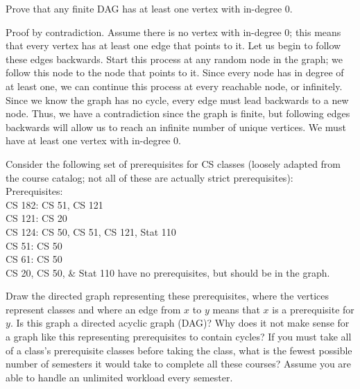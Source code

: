 \documentclass[solution, letterpaper]{cs20inclass}
\begin{document}
\problem
Prove that any finite DAG has at least one vertex with in-degree 0.


\begin{solution}
Proof by contradiction. Assume there is no vertex with in-degree 0; this means that every vertex has at least one edge that points to it. Let us begin to follow these edges backwards. Start this process at any random node in the graph; we follow this node to the node that points to it. Since every node has in degree of at least one, we can continue this process at every reachable node, or infinitely. Since we know the graph has no cycle, every edge must lead backwards to a new node. Thus, we have a contradiction since the graph is finite, but following edges backwards will allow us to reach an infinite number of unique vertices. We must have at least one vertex with in-degree 0. 


\end{solution}

\problem
Consider the following set of prerequisites for CS classes (loosely adapted from the course catalog; not all of these are actually strict prerequisites): \\
Prerequisites: \\
CS 182: CS 51, CS 121 \\
CS 121: CS 20 \\
CS 124: CS 50, CS 51, CS 121, Stat 110 \\
CS 51: CS 50 \\
CS 61: CS 50 \\
CS 20, CS 50, \& Stat 110 have no prerequisites, but should be in the graph.

\subproblem Draw the directed graph representing these prerequisites, where the vertices represent classes and where an edge from $x$ to $y$ means that $x$ is a prerequisite for $y$.
\subproblem Is this graph a directed acyclic graph (DAG)? Why does it not make sense for a graph like this representing prerequisites to contain cycles?
\subproblem If you must take all of a class's prerequisite classes before taking the class, what is the fewest possible number of semesters it would take to complete all these courses? Assume you are able to handle an unlimited workload every semester.
\end{document}
